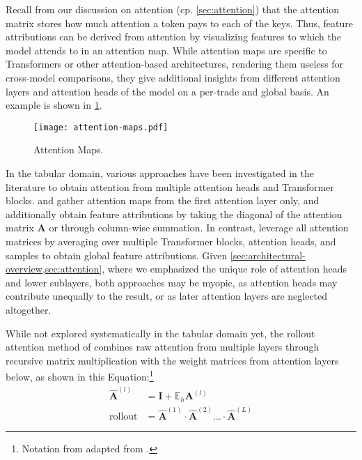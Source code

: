 Recall from our discussion on attention (cp. \cref{sec:attention}) that the attention matrix stores how much attention a token pays to each of the keys. Thus, feature attributions can be derived from attention by visualizing features to which the model attends to in an attention map. While attention maps are specific to Transformers or other attention-based architectures, rendering them useless for cross-model comparisons, they give additional insights from different attention layers and attention heads of the model on a per-trade and global basis. An example is shown in \cref{fig:attention-maps}.

\begin{figure}[ht]
    \centering
    \texttt{[image: attention-maps.pdf]}
    \caption[Attention Maps]{Attention Maps.}
    \label{fig:attention-maps}
\end{figure}

In the tabular domain, various approaches have been investigated in the literature to obtain attention from multiple attention heads and Transformer blocks. \textcite[][18]{somepalliSaintImprovedNeural2021} and \textcite[][11]{borisovDeepNeuralNetworks2022} gather attention maps from the first attention layer only, and \textcite[][11]{borisovDeepNeuralNetworks2022} additionally obtain feature attributions by taking the diagonal of the attention matrix $\mathbf{A}$ or through column-wise summation. In contrast, \textcite[][10]{gorishniyRevisitingDeepLearning2021} leverage all attention matrices by averaging over multiple Transformer blocks, attention heads, and samples to obtain global feature attributions. Given \cref{sec:architectural-overview,sec:attention}, where we emphasized the unique role of attention heads and lower sublayers, both approaches may be myopic, as attention heads may contribute unequally to the result, or as later attention layers are neglected altogether.

While not explored systematically in the tabular domain yet, the rollout attention method of \textcite[][3]{abnarQuantifyingAttentionFlow2020} combines raw attention from multiple layers through recursive matrix multiplication with the weight matrices from attention layers below, as shown in this Equation:\footnote{Notation from adapted from \textcite[][786]{cheferTransformerInterpretabilityAttention2021}.}
\begin{equation}
    \begin{aligned}
        \hat{\mathbf{A}}^{(l)}    & =\mathbf{I}+\mathbb{E}_h \mathbf{A}^{(l)}                                              \\
        \operatorname { rollout } & =\hat{\mathbf{A}}^{(1)} \cdot \hat{\mathbf{A}}^{(2)} \ldots\cdot\hat{\mathbf{A}}^{(L)}
    \end{aligned}
    \label{eq:attention-map-rollout}
\end{equation}

